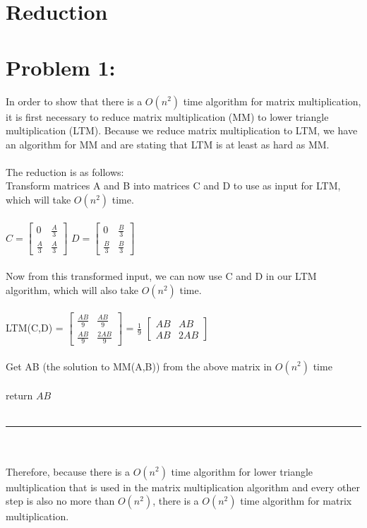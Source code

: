 \documentclass[12pt]{article}
\begin{document}
\section*{Reduction}
\section*{Problem 1: }
In order to show that there is a {$O(n^2)$} time algorithm for matrix multiplication, it is first necessary to reduce matrix multiplication (MM) to lower triangle multiplication (LTM). Because we reduce matrix multiplication to LTM, we have an algorithm for MM and are stating that LTM is at least as hard as MM.\\\\
The reduction is as follows:\\

Transform matrices A and B into matrices C and D to use as input for LTM, which will take {$O(n^2)$} time.\\\\
$C = \begin{bmatrix}
0 & \frac{A}{3}\\[0.3em]
\frac{A}{3} & \frac{A}{3}
\end{bmatrix}$
$D = \begin{bmatrix}
0 & \frac{B}{3}\\[0.3em]
\frac{B}{3} & \frac{B}{3}
\end{bmatrix}$\\\\
Now from this transformed input, we can now use C and D in our LTM algorithm, which will also take {$O(n^2)$} time.\\\\
LTM(C,D) = $\begin{bmatrix}
\frac{AB}{9} & \frac{AB}{9}\\[0.3em]
\frac{AB}{9} & \frac{2AB}{9}
\end{bmatrix}$
=
{$\frac{1}{9}$} $\begin{bmatrix}
AB & AB\\[0.3em]
AB & 2AB
\end{bmatrix}$ \\\\
Get AB (the solution to MM(A,B)) from the above matrix in {$O(n^2)$} time\\\\
{return $AB$}\\\\
\noindent\rule{14cm}{0.4pt}\\\\
Therefore, because there is a {$O(n^2)$} time algorithm for lower triangle multiplication that is used in the matrix multiplication algorithm and every other step is also no more than {$O(n^2)$}, there is a {$O(n^2)$} time algorithm for matrix multiplication.
\end{document}
